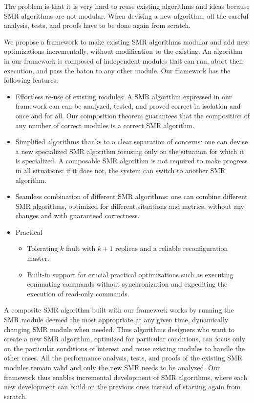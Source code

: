 The problem is that it is very hard to reuse existing algorithms and ideas because SMR algorithms are not modular. When devising a new algorithm, all the careful analysis, tests, and proofs have to be done again from scratch.

We propose a framework to make existing SMR algorithms modular and add new optimizations incrementally, without modification to the existing. 
An algorithm in our framework is composed of independent modules that can run, abort their execution, and pass the baton to any other module.
Our framework has the following features:
\begin{itemize}
  \item Effortless re-use of existing modules: A SMR algorithm expressed in our framework can can be analyzed, tested, and proved correct in isolation and once and for all.  Our composition theorem guarantees that the composition of any number of correct modules is a correct SMR algorithm. 
  \item Simplified algorithms thanks to a clear separation of concerns: one can devise a new specialized SMR algorithm focusing only on the situation for which it is specialized.  A composable SMR algorithm is not required to make progress in all situations: if it does not, the system can switch to another SMR algorithm.

  \item Seamless combination of different SMR algorithms: one can combine different SMR algorithms, optimized for different situations and metrics, without any changes and with guaranteed correctness.
  \item Practical
    \begin{itemize}
  \item Tolerating $k$ fault with $k+1$ replicas and a reliable reconfiguration master. 
  \item Built-in support for crucial practical optimizations such as executing commuting commands without synchronization and expediting the execution of read-only commands.
    \end{itemize}
\end{itemize}

A composite SMR algorithm built with our framework works by running the SMR module deemed the most appropriate at any given time, dynamically changing SMR module when needed.
Thus algorithms designers who want to create a new SMR algorithm, optimized for particular conditions, can focus only on the particular conditions of interest and reuse existing modules to handle the other cases. All the performance analysis, tests, and proofs of the existing SMR modules remain valid and only the new SMR needs to be analyzed.
Our framework thus enables incremental development of SMR algorithms, where each new development can build on the previous ones instead of starting again from scratch.

